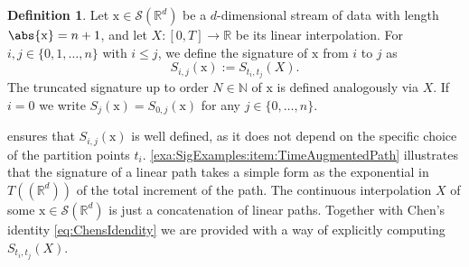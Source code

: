 \documentclass[
    a4paper,
    11pt,
    bibliography=totoc,
    listof=totoc,      
    headinclude=true,
    cleardoublepage=empty,
]{scrbook}
\theoremstyle{plain}
\theoremstyle{definition}
\newtheorem{definition}[theorem]{Definition}
\theoremstyle{remark}
\newcommand{\SetR}{\mathbb R}
\newcommand{\SetN}{\mathbb N}
\begin{document}
\begin{definition}
\label{def:SignatureOfStream}
    Let $\mathrm x\in\mathcal{S}(\SetR^d)$ be a $d$-dimensional stream of data 
    with length $\abs{\mathrm x}=n+1$, and let $X:[0,T]\to\SetR$ be its linear 
    interpolation. For $i,j\in\{0, 1, \dots, n\}$ with $i\leq j$, we define 
    the signature of $\mathrm x$ from $i$ to $j$ as
    \begin{equation}
    \label{eq:SignatureStream}
        S_{i,j}(\mathrm x) := S_{t_i,t_j}(X).
    \end{equation}
    The truncated signature up to order $N\in\SetN$ of $\mathrm x$ is defined
    analogously via $X$. If $i=0$ we write $S_j(\mathrm x) = 
    S_{0,j}(\mathrm x)$ for any $j\in\{0,\dots,n\}$.
\end{definition}

 ensures that $S_{i,j}(\mathrm x)$
is well defined, as it does not depend on the specific choice of the partition
points $t_i$. 
\ref{exa:SigExamples:item:TimeAugmentedPath} 
illustrates that the signature of a linear path takes a simple form as the 
exponential in $T((\SetR^d))$ of the total increment of the path. The 
continuous interpolation $X$ of some $\mathrm x \in 
\mathcal{S}(\SetR^d)$ is just a concatenation of linear paths. Together with 
Chen's identity \eqref{eq:ChensIdendity} we are provided with a way of 
explicitly computing $S_{t_i,t_j}(X)$.
\end{document}
